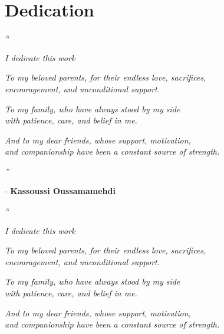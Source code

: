 \documentclass[11pt,a4paper]{report}
\begin{document}
\renewcommand\bibname{References} 



\chapter*{Dedication}

\vspace*{0.8cm}

\begin{flushleft}
{\Large\textit{``}}
\end{flushleft}

\begin{center}
\textit{I dedicate this work}
\vspace{0.2cm}

\textit{To my beloved parents, for their endless love, sacrifices,}\\
\textit{encouragement, and unconditional support.}
\vspace{0.2cm}

\textit{To my family, who have always stood by my side}\\
\textit{with patience, care, and belief in me.}
\vspace{0.2cm}

\textit{And to my dear friends, whose support, motivation,}\\
\textit{and companionship have been a constant source of strength.}
\end{center}

\begin{flushright}
{\Large\textit{''}}
\end{flushright}

\begin{flushright}
- \textbf{Kassoussi Oussamamehdi}
\end{flushright}

\vspace{1.2cm}

\begin{flushleft}
{\Large\textit{``}}
\end{flushleft}

\begin{center}
\textit{I dedicate this work}
\vspace{0.2cm}

\textit{To my beloved parents, for their endless love, sacrifices,}\\
\textit{encouragement, and unconditional support.}
\vspace{0.2cm}

\textit{To my family, who have always stood by my side}\\
\textit{with patience, care, and belief in me.}
\vspace{0.2cm}

\textit{And to my dear friends, whose support, motivation,}\\
\textit{and companionship have been a constant source of strength.}
\end{center}
\end{document}
